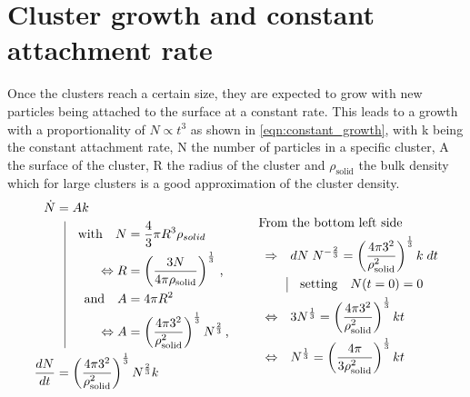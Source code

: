 \section{Cluster growth and constant attachment rate}
\label{sec:cluster_growth}
Once the clusters reach a certain size, they are expected to grow with new particles being attached to the surface at a constant rate. This leads to a growth with a proportionality of $N \propto t^3$ as shown in \autoref{eqn:constant_growth}, with k being the constant attachment rate, N the number of particles in a specific cluster, A the surface of the cluster, R the radius of the cluster and $\rho_{\text{solid}}$ the bulk density which for large clusters is a good approximation of the cluster density.\\
\begin{align}
\label{eqn:constant_growth}  
\begin{split}
\dot{N} &= A k \\
          & \; \; \, \vrule
  \begin{aligned}[t]
    \quad \text{with}  \quad  N &= \frac{4}{3} \pi R^3 \rho_{solid}\\
    \Leftrightarrow R &= \left( \frac{3 N }{4 \pi \rho_{\text{solid}} }\right)^{\frac{1}{3}} \, \text{,} \\
    \quad \text{and}   \quad A &= 4 \pi R^2 \\
    \Leftrightarrow A &= \left(\frac{4 \pi 3^2 }{\rho_{\text{solid}}^2} \right)^\frac{1}{3} N^\frac{2}{3} \, \text{,}\\
  \end{aligned}\\
\frac{dN}{dt} &= \left(\frac{4 \pi 3^2 }{\rho_{\text{solid}}^2} \right)^\frac{1}{3}  N^\frac{2}{3} k \\
\end{split}
\hspace{1cm}
\begin{split}
& \!\!\!\!\!\!\!\!\! \text{From the bottom left side}\\
\Rightarrow& \quad dN \; N^{-\frac{2}{3}} = \left(\frac{4 \pi 3^2 }{\rho_{\text{solid}}^2} \right)^\frac{1}{3} k \; dt\\
          & \; \; \, \vrule
  \begin{aligned}[t]
    \quad \text{setting}  \quad  N(t=0) = 0\\
  \end{aligned}\\
\Leftrightarrow& \quad 3 N^{\frac{1}{3}} = \left(\frac{4 \pi 3^2 }{\rho_{\text{solid}}^2} \right)^\frac{1}{3} k t\\
\Leftrightarrow&  \quad N^{\frac{1}{3}} = \left( \frac{4 \pi}{3 \rho_{\text{solid}}^2} \right)^\frac{1}{3} k t
\end{split}
\end{align}  

